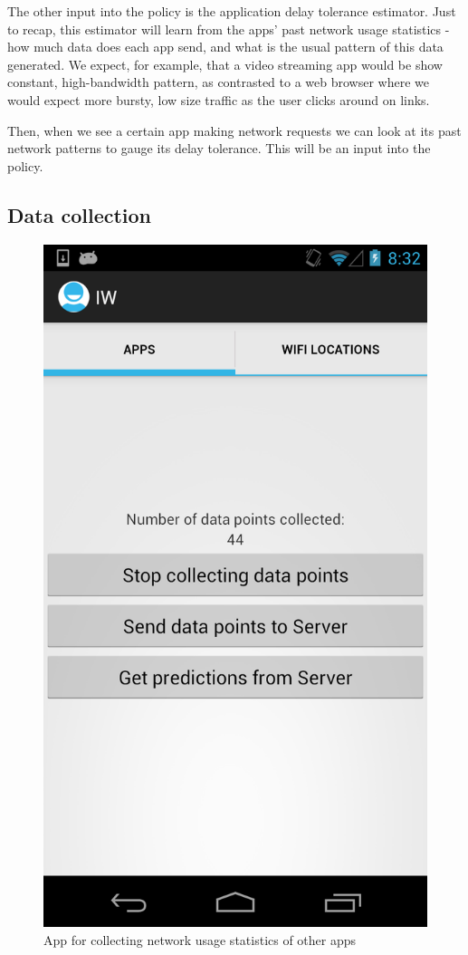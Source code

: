 \documentclass[12pt, fleqn]{article}
\begin{document}
The other input into the policy is the application delay tolerance estimator. 
Just to recap, this estimator will learn from the apps' past network usage statistics - 
how much data does each app send, and what is the usual pattern of this data 
generated. We expect, for example, that a video streaming app would be show
constant, high-bandwidth pattern, as contrasted to a web browser where we would 
expect more bursty, low size traffic as the user clicks around on links.

Then, when we see a certain app making network requests we can look at its past network 
patterns to gauge its delay tolerance. This will be an input into the policy.
 
\subsection{Data collection}

\begin{figure}[htp]
\centering
\includegraphics[scale=0.2]{img/app-screenshot-apps.png}
\caption{App for collecting network usage statistics of other apps \label{fig-app-screenshot-apps}}
\end{figure}
\medskip
\end{document}
